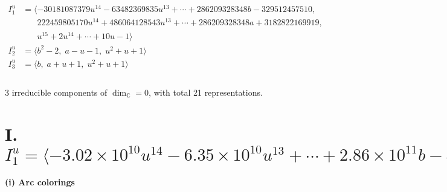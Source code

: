 \documentclass[1p]{elsarticle_modified}
\theoremstyle{definition}
\begin{document}
\begin{align*}
I^u_{1}&=\langle 
-30181087379 u^{14}-63482369835 u^{13}+\cdots+286209328348 b-329512457510,\\
\phantom{I^u_{1}}&\phantom{= \langle  }222459805170 u^{14}+486064128543 u^{13}+\cdots+286209328348 a+3182822169919,\\
\phantom{I^u_{1}}&\phantom{= \langle  }u^{15}+2 u^{14}+\cdots+10 u-1\rangle \\
I^u_{2}&=\langle 
b^2-2,\;a- u-1,\;u^2+u+1\rangle \\
I^u_{3}&=\langle 
b,\;a+u+1,\;u^2+u+1\rangle \\
\\
\end{align*}
\raggedright * 3 irreducible components of $\dim_{\mathbb{C}}=0$, with total 21 representations.\\
\newpage
\renewcommand{\arraystretch}{1}
\centering \section*{I. $I^u_{1}= \langle -3.02\times10^{10} u^{14}-6.35\times10^{10} u^{13}+\cdots+2.86\times10^{11} b-3.30\times10^{11},\;2.22\times10^{11} u^{14}+4.86\times10^{11} u^{13}+\cdots+2.86\times10^{11} a+3.18\times10^{12},\;u^{15}+2 u^{14}+\cdots+10 u-1 \rangle$}
\flushleft \textbf{(i) Arc colorings}\\
\end{document}

